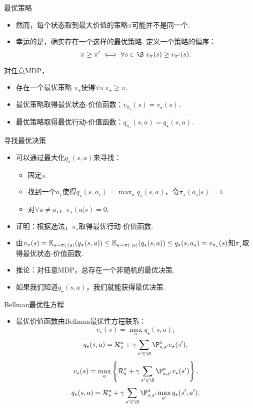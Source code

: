 \begin{frame}{最优策略}
\begin{itemize}
    \item 然而，每个状态取到最大价值的策略$\pi$可能并不是同一个.
    \item 幸运的是，确实存在一个这样的最优策略. 定义一个策略的偏序：
    \[\pi\ge\pi' \iff \forall s\in\S\ v_\pi(s) \ge v_{\pi'}(s).\]
\end{itemize}
\begin{theorem}[MDP解的存在性]
对任意MDP，
\begin{itemize}
    \item 存在一个最优策略 $\pi_\star$使得$\forall \pi\ \pi_\star\ge\pi$.
    \item 最优策略取得最优状态-价值函数：$v_{\pi_\star}(s) = v_\star(s)$.
    \item 最优策略取得最优行动-价值函数：$q_{\pi_\star}(s,a)=q_\star(s,a)$.
\end{itemize}
\end{theorem}
\end{frame}

\begin{frame}{寻找最优决策}
\begin{itemize}
    \item 可以通过最大化$q_\star(s,a)$来寻找：
    \begin{itemize}
        \item 固定$s$.
        \item 找到一个$a_\star$使得$q_\star(s,a_\star)=\max_{a}q_\star(s,a)$，令$\pi_\star(a_\star|s)=1$.
        \item 对$\forall a\neq a_\star$，$\pi_\star(a|s)=0$.
    \end{itemize}
    \item 证明：根据选法，$\pi_\star$取得最优行动-价值函数.
    \item 由$v_\pi(s) = \mathbb{E}_{a\sim\pi(\cdot|s)}(q_\pi(s,a))\leq \mathbb{E}_{a\sim\pi(\cdot|s)}(q_\star(s,a))\leq q_\star(s,a_\star)=v_{\pi_\star}(s)$知$\pi_\star$取得最优状态-价值函数.
    \item 推论：对任意MDP，总存在一个非随机的最优决策.
    \item 如果我们知道$q_\star(s,a)$，我们就能获得最优决策. %
\end{itemize}
\end{frame}

\begin{frame}{Bellman最优性方程}
\begin{itemize}
    \item 最优价值函数由Bellman最优性方程联系：
\[v_\star(s) = \max_a q_\star(s,a),\]
\[q_\star(s,a) = \mathcal R_s^a + \gamma \sum_{s'\in \S}\P_{s,s'}^av_\star(s'),\]
\[v_\star(s) = \max_a\left\{\mathcal R_s^a + \gamma \sum_{s'\in \S}\P_{s,s'}^av_\star(s')\right\},\]
\[q_\star(s,a) = \mathcal R_s^a+\gamma \sum_{s'\in \S}\P_{s,s'}^a\max_{a'}q_\star(s',a').\]
\end{itemize}
\end{frame}

